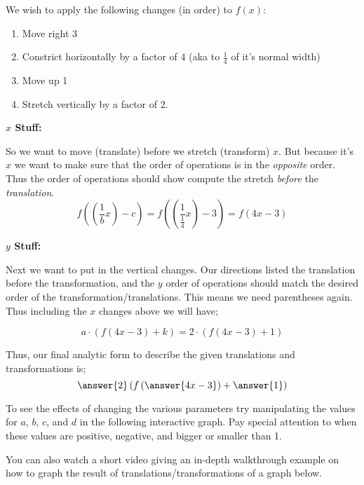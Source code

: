 \documentclass{ximera}
\begin{document}
    \begin{explanation}
        We wish to apply the following changes (in order) to $f(x)$:
        \begin{enumerate}
            \item Move right 3
            \item Constrict horizontally by a factor of 4 (aka to $\frac{1}{4}$ of it's normal width)
            \item Move up 1
            \item Stretch vertically by a factor of 2.
        \end{enumerate}
        
        \textbf{$x$ Stuff:}
        
        So we want to move (translate) before we stretch (transform) $x$. But because it's $x$ we want to make sure that the order of operations is in the \textit{opposite} order. Thus the order of operations should show compute the stretch \textit{before} the \textit{translation}.
        \[
            f\left(\left(\frac{1}{b}x\right) - c \right) = f\left(\left(\frac{1}{\frac{1}{4}}x\right) - 3 \right) = f(4x - 3)
        \]
        
        \textbf{$y$ Stuff:}
        
        Next we want to put in the vertical changes. Our directions listed the translation before the transformation, and the $y$ order of operations should match the desired order of the transformation/translations. This means we need parentheses again. Thus including the $x$ changes above we will have;
        
        \[
            a\cdot \left( f\left(4x-3\right) + k \right)
            = 2\cdot \left( f\left(4x-3\right) + 1 \right) 
        \]
        
        Thus, our final analytic form to describe the given translations and transformations is;
        \[
            \answer{2}\left(f \left( \answer{4x-3} \right) + \answer{1} \right)
        \]
    \end{explanation}
    
    To see the effects of changing the various parameters try manipulating the values for $a$, $b$, $c$, and $d$ in the following interactive graph. Pay special attention to when these values are positive, negative, and bigger or smaller than 1.
    
    
    You can also watch a short video giving an in-depth walkthrough example on how to graph the result of translations/transformations of a graph below.
    
\end{document}
